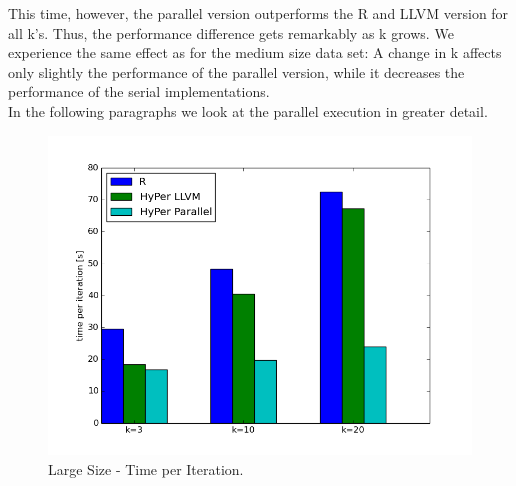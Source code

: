 This time, however, the parallel version outperforms the R and LLVM version for all k’s. Thus, the performance difference gets remarkably as k grows. We experience the same effect as for the medium size data set: A change in k affects only slightly the performance of the parallel version, while it decreases the performance of the serial implementations. 
\\
In the following paragraphs we look at the parallel execution in greater detail. 


\begin{figure}[htsb]
  \centering
  \includegraphics[scale=0.4, trim="0cm 1.5cm 0cm 0cm"]{figures/charts/final_150M}
  \caption[Large Size - Time per Iteration]{Large Size - Time per Iteration.}
  \label{fig:final_150M}
\end{figure}


